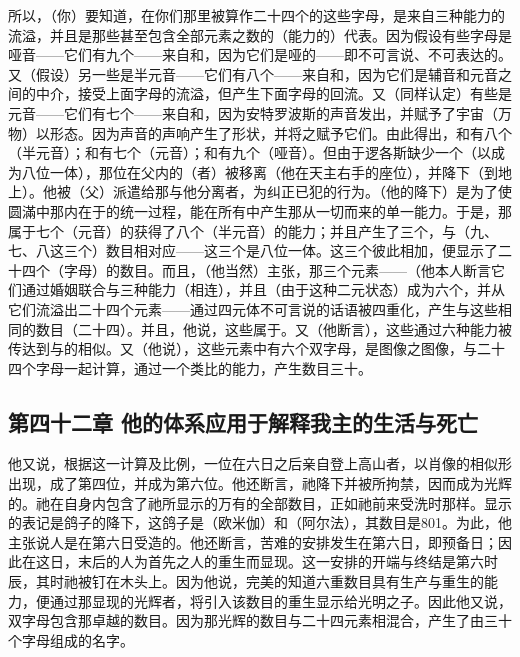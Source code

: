 所以，（你）要知道，在你们那里被算作二十四个的这些字母，是来自三种能力的流溢，并且是那些甚至包含全部元素之数的（能力的）代表。因为假设有些字母是哑音——它们有九个——来自和，因为它们是哑的——即不可言说、不可表达的。又（假设）另一些是半元音——它们有八个——来自和，因为它们是辅音和元音之间的中介，接受上面字母的流溢，但产生下面字母的回流。又（同样认定）有些是元音——它们有七个——来自和，因为安特罗波斯的声音发出，并赋予了宇宙（万物）以形态。因为声音的声响产生了形状，并将之赋予它们。由此得出，和有八个（半元音）；和有七个（元音）；和有九个（哑音）。但由于逻各斯缺少一个（以成为八位一体），那位在父内的（者）被移离（他在天主右手的座位），并降下（到地上）。他被（父）派遣给那与他分离者，为纠正已犯的行为。（他的降下）是为了使圆滿中那内在于的统一过程，能在所有中产生那从一切而来的单一能力。于是，那属于七个（元音）的获得了八个（半元音）的能力；并且产生了三个，与（九、七、八这三个）数目相对应——这三个是八位一体。这三个彼此相加，便显示了二十四个（字母）的数目。而且，（他当然）主张，那三个元素——（他本人断言它们通过婚姻联合与三种能力（相连），并且（由于这种二元状态）成为六个，并从它们流溢出二十四个元素——通过四元体不可言说的话语被四重化，产生与这些相同的数目（二十四）。并且，他说，这些属于。又（他断言），这些通过六种能力被传达到与的相似。又（他说），这些元素中有六个双字母，是图像之图像，与二十四个字母一起计算，通过一个类比的能力，产生数目三十。\par


\subsection{第四十二章 他的体系应用于解释我主的生活与死亡}

他又说，根据这一计算及比例，一位在六日之后亲自登上高山者，以肖像的相似形出现，成了第四位，并成为第六位。他还断言，祂降下并被所拘禁，因而成为光辉的。祂在自身内包含了祂所显示的万有的全部数目，正如祂前来受洗时那样。显示的表记是鸽子的降下，这鸽子是（欧米伽）和（阿尔法），其数目是801。为此，他主张说人是在第六日受造的。他还断言，苦难的安排发生在第六日，即预备日；因此在这日，末后的人为首先之人的重生而显现。这一安排的开端与终结是第六时辰，其时祂被钉在木头上。因为他说，完美的知道六重数目具有生产与重生的能力，便通过那显现的光辉者，将引入该数目的重生显示给光明之子。因此他又说，双字母包含那卓越的数目。因为那光辉的数目与二十四元素相混合，产生了由三十个字母组成的名字。\par


